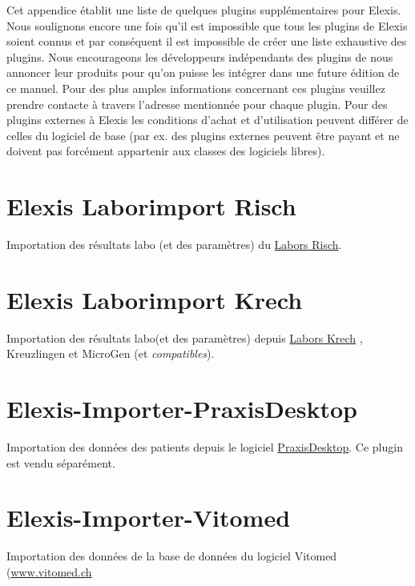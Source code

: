 
Cet appendice établit une liste de quelques plugins supplémentaires pour Elexis. Nous soulignons encore une fois qu'il est impossible que tous les plugins de Elexis soient connus et par conséquent il est impossible de créer une liste exhaustive des plugins. Nous encourageons les développeurs indépendants des plugins de nous annoncer leur produits pour qu'on puisse les intégrer dans une future édition de ce manuel.
Pour des plus amples informations concernant ces plugins veuillez prendre contacte à travers l'adresse mentionnée pour chaque plugin. Pour des plugins externes à Elexis les conditions d'achat et d'utilisation peuvent différer de celles du logiciel de base (par ex. des plugins externes peuvent être payant et ne doivent pas forcément appartenir aux classes des logiciels libres).


\section{Elexis Laborimport Risch}

Importation des résultats labo (et des paramètres) du \href{http://www.risch.ch}{Labors Risch}.

\section{Elexis Laborimport Krech}

Importation des résultats labo(et des paramètres) depuis \href{http://www.labor.ch}{Labors Krech} , Kreuzlingen et MicroGen (et \textit{ compatibles}).

\section{Elexis-Importer-PraxisDesktop}

Importation des données des patients depuis le logiciel \href{http://www.praxisdesktop.ch}{PraxisDesktop}. Ce plugin est vendu séparément.


 \section{Elexis-Importer-Vitomed}

 Importation des données de la base de données du logiciel Vitomed (\href{http://www.vitomed.ch}{www.vitomed.ch}




